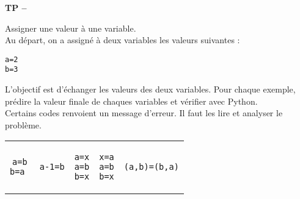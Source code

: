 






\begin{center}
{\Large\bf TP \no {\numero} -- \descrip}
\end{center}




\begin{exercice}Assigner une valeur à une variable.\\
Au départ, on a assigné à deux variables les valeurs suivantes :
\begin{verbatim}
a=2
b=3
\end{verbatim}
L'objectif est d'échanger les valeurs des deux variables. Pour chaque exemple, prédire la valeur finale de chaques variables et vérifier avec Python.\\
Certains codes renvoient un message d'erreur. Il faut les lire et analyser le problème.
\begin{center}
\begin{tabular}{c|c|c|c|c}
\begin{minipage}{2.5cm}
\begin{verbatim}
a=b
b=a 
\end{verbatim}
\end{minipage}
&
\begin{minipage}{2.5cm}
\begin{verbatim}
a-1=b
\end{verbatim}
\end{minipage}
&
\begin{minipage}{2.5cm}
\begin{verbatim}
a=x
a=b
b=x
\end{verbatim}
\end{minipage}
&
\begin{minipage}{2.5cm}
\begin{verbatim}
x=a
a=b
b=x
\end{verbatim}
\end{minipage}
&
\begin{minipage}{2.5cm}
\begin{verbatim}
(a,b)=(b,a)
\end{verbatim}
\end{minipage}
\end{tabular}
\end{center}
\end{exercice}
\bigskip
 


